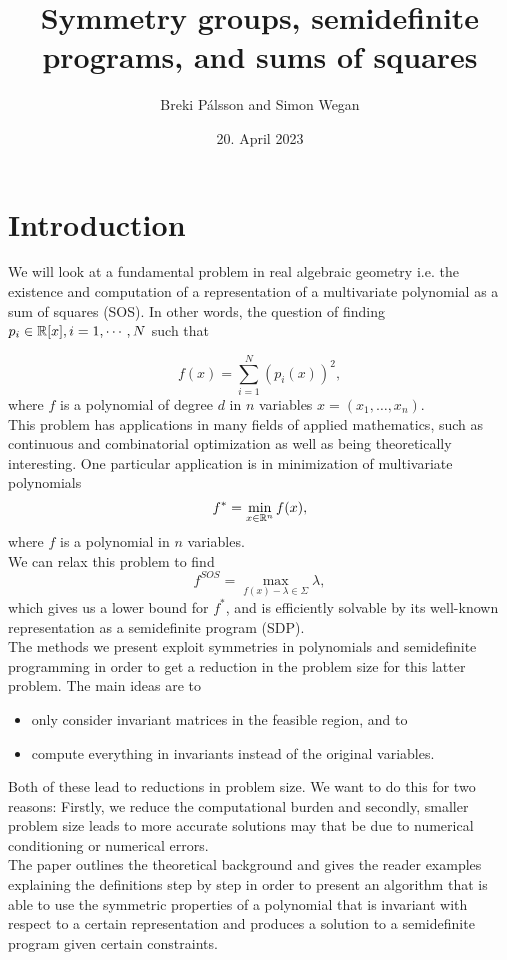\documentclass[]{article}
\begin{document}
\title{Symmetry groups, semidefinite programs, and sums of squares}
\author{Breki Pálsson and Simon Wegan}
\date{20. April 2023}

\maketitle

\section*{Introduction}
We will look at a fundamental problem in real algebraic geometry i.e. the existence and computation of a
representation of a multivariate polynomial as a sum of squares (SOS). In other words, the
question of finding $p_i \in \mathbb R[x], i = 1, \cdots, N$ such that

\[
    f(x) = \sum_{i=1}^{N}(p_i(x))^2,
\]
where $f$ is a polynomial of degree $d$ in $n$ variables $x=(x_1,\ldots,x_n)$.\\
This problem has applications in many fields of applied mathematics, such as continuous and combinatorial optimization as well as being theoretically interesting. 
One particular application is in minimization of multivariate polynomials
\[
    f^\ast=\min_{x\in\mathbb R^n}f(x),
\]
where $f$ is a polynomial in $n$ variables.\\
We can relax this problem to find 
\[
    f^{SOS}=\max_{f(x)-\lambda \in \Sigma}\lambda,
\]
which gives us a lower bound for $f^\ast$, and is efficiently solvable by its well-known representation as a semidefinite program (SDP).\\

The methods we present exploit symmetries in polynomials and semidefinite programming in order to get a reduction in the problem size for this latter problem. 
The main ideas are to
\begin{itemize}
    \item only consider invariant matrices in the feasible region, and to
    \item compute everything in invariants instead of the original variables.
\end{itemize}
Both of these lead to reductions in problem size.
We want to do this for two reasons: Firstly, we reduce the computational burden and secondly, smaller problem size leads to more accurate solutions may that be due to numerical conditioning or numerical errors.\\

The paper outlines the theoretical background and gives the reader examples explaining the definitions step by step in order to present an algorithm that is able to use the 
symmetric properties of a polynomial that is invariant with respect to a certain representation and produces a solution to a semidefinite program given certain constraints.\\
\end{document}
